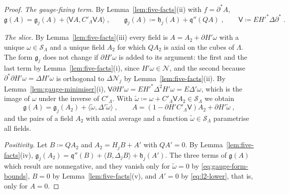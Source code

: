 \documentclass[11pt]{preprint}
\numberwithin{equation}{section}
\theoremstyle{definition}
\theoremstyle{remark}
\theoremstyle{plain}
\begin{document}
\begin{proof}
\emph{The gauge-fixing term.} By Lemma~\ref{lem:five-facts}(ii) with $f = \partial^*A$,
\begin{equation}\label{eq:two-scale-form-split}
    \mathfrak g(A) = \mathfrak g_j(A) + \langle\mathsf VA, C'_\Lambda\mathsf VA\rangle\;,
    \qquad
    \mathfrak g_j(A) \coloneqq \mathfrak h_j(A) + \mathfrak q''(QA)\;,
    \qquad
    \mathsf V \coloneqq EH'^*\Delta\partial^*\;.
\end{equation}

\emph{The slice.} By Lemma~\ref{lem:five-facts}(iii) every field is $A = A_2 + \partial H'\omega$ with a unique $\omega \in \mathcal S_\Lambda$ and a unique field $A_2$ for which $QA_2$ is axial on the cubes of $\Lambda$. The form $\mathfrak g_j$ does not change if $\partial H'\omega$ is added to its argument: the first and the last term by Lemma~\ref{lem:five-facts}(i), since $H'\omega \in \mathcal N$, and the second because $\partial^*\partial H'\omega = \Delta H'\omega$ is orthogonal to $\Delta\mathcal N_j$ by Lemma~\ref{lem:five-facts}(ii). By Lemma~\ref{lem:gauge-minimiser}(i), $\mathsf V\partial H'\omega = EH'^*\Delta^2H'\omega = E\Delta'\omega$, which is the image of $\omega$ under the inverse of $C'_\Lambda$. With $\tilde\omega \coloneqq \omega + C'_\Lambda\mathsf VA_2 \in \mathcal S_\Lambda$ we obtain
\begin{equation}\label{eq:form-in-slice}
    \mathfrak g(A) = \mathfrak g_j(A_2) + \langle\tilde\omega, \Delta'\tilde\omega\rangle\;,
    \qquad
    A = (1 - \partial H'C'_\Lambda\mathsf V)A_2 + \partial H'\tilde\omega\;,
\end{equation}
and the pairs of a field $A_2$ with axial average and a function $\tilde\omega \in \mathcal S_\Lambda$ parametrise all fields.

\emph{Positivity.} Let $B \coloneqq QA_2$ and $A_2 = H_jB + A'$ with $QA' = 0$. By Lemma~\ref{lem:five-facts}(iv), $\mathfrak g_j(A_2) = \mathfrak q''(B) + \langle B, \Delta_jB\rangle + \mathfrak h_j(A')$. The three terms of $\mathfrak g(A)$ which result are nonnegative, and they vanish only for $\tilde\omega = 0$ by \eqref{eq:gauge-form-bounds}, $B = 0$ by Lemma~\ref{lem:five-facts}(v), and $A' = 0$ by \eqref{eq:l2-lower}, that is, only for $A = 0$.


\end{proof}
\end{document}
